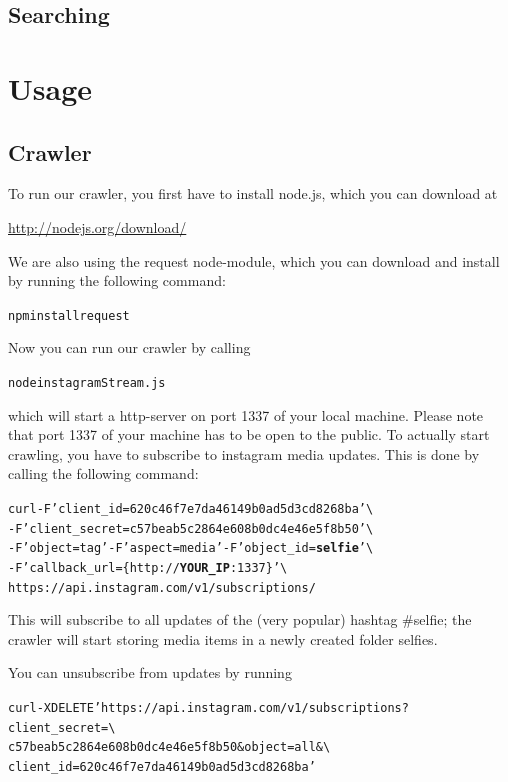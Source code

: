 \documentclass[11pt]{article}
\begin{document}
	\subsection{Searching}


\section{Usage}
	\subsection{Crawler}
		To run our crawler, you first have to install node.js, which you can download at 
		\begin{center}{\vspace{-3mm}\url{http://nodejs.org/download/}}\end{center}
		We are also using the request node-module, which you can download and install by running the following command:
		\begin{alltt}
			npm install request
		\end{alltt}
		Now you can run our crawler by calling
		\begin{alltt}
			node instagramStream.js
		\end{alltt}
		which will start a http-server on port 1337 of your local machine. Please note that port 1337 of your machine has to be open to the public. To actually start crawling, you have to subscribe to instagram media updates. This is done by calling the following command:
		\begin{alltt}
			curl -F 'client_id=620c46f7e7da46149b0ad5d3cd8268ba' \textbackslash 
			     -F 'client_secret=c57beab5c2864e608b0dc4e46e5f8b50' \textbackslash
			     -F 'object=tag' -F 'aspect=media' -F 'object_id=\textbf{selfie}' \textbackslash
			     -F 'callback_url=\{http://\textbf{YOUR_IP}:1337\}' \textbackslash
			     https://api.instagram.com/v1/subscriptions/
		\end{alltt}
		This will subscribe to all updates of the (very popular) hashtag $\#$selfie; the crawler will start storing media items in a newly created folder selfies.

		You can unsubscribe from updates by running
		\begin{alltt}
			curl -X DELETE 'https://api.instagram.com/v1/subscriptions?client_secret=\textbackslash
			     c57beab5c2864e608b0dc4e46e5f8b50&object=all&\textbackslash
			     client_id=620c46f7e7da46149b0ad5d3cd8268ba'
		\end{alltt}
\end{document}
